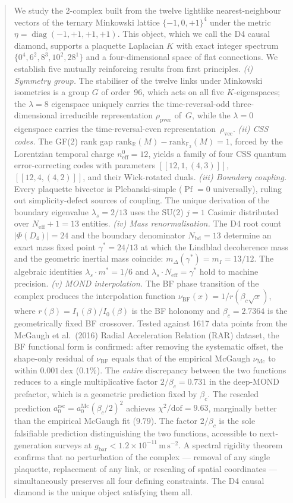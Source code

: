 \documentclass[12pt,a4paper]{article}
\theoremstyle{plain}
\theoremstyle{definition}
\newcommand{\R}{\mathbb{R}}
\newcommand{\GF}[1]{\mathbb{F}_{#1}}
\newcommand{\lams}{\lambda_s}
\newcommand{\gstar}{\gamma^{*}}
\newcommand{\mstar}{m^{*}}
\newcommand{\Neff}{N_{\mathrm{eff}}}
\newcommand{\Nbd}{N_{\mathrm{bd}}}
\newcommand{\betac}{\beta_c}
\newcommand{\nuBF}{\nu_{\mathrm{BF}}}
\newcommand{\nuMc}{\nu_{\mathrm{Mc}}}
\newcommand{\rank}{\mathrm{rank}}
\newcommand{\rhovec}{\rho_{\mathrm{vec}}}
\newcommand{\rhopvec}{\rho_{\mathrm{pvec}}}
\DeclareMathOperator{\Pf}{Pf}
\DeclareMathOperator{\diag}{diag}
\begin{document}
\begin{abstract}
We study the 2-complex built from the twelve lightlike nearest-neighbour vectors
of the ternary Minkowski lattice $\{-1,0,+1\}^4$ under the metric
$\eta = \diag(-1,+1,+1,+1)$.  This object, which we call the D4 causal
diamond, supports a plaquette Laplacian $K$ with exact integer spectrum
$\{0^4, 6^2, 8^3, 10^2, 28^1\}$ and a four-dimensional space of flat
connections.  We establish five mutually reinforcing results from first
principles.
\emph{(i) Symmetry group.}  The stabiliser of the twelve links under
Minkowski isometries is a group $G$ of order~96, which acts on all five
$K$-eigenspaces; the $\lambda=8$ eigenspace uniquely carries the
time-reversal-odd three-dimensional irreducible representation
$\rhopvec$ of~$G$, while the $\lambda=0$ eigenspace carries the
time-reversal-even representation~$\rhovec$.
\emph{(ii) CSS codes.}  The GF(2) rank gap
$\rank_{\R}(M) - \rank_{\GF{2}}(M) = 1$, forced by the Lorentzian temporal
charge $n_{\mathrm{eff}}^0 = 12$, yields a family of four CSS quantum
error-correcting codes with parameters $[[12,1,(4,3)]]$, $[[12,4,(4,2)]]$,
and their Wick-rotated duals.
\emph{(iii) Boundary coupling.}  Every plaquette bivector is Plebanski-simple
($\Pf = 0$ universally), ruling out simplicity-defect sources of coupling.
The unique derivation of the boundary eigenvalue
$\lams = 2/13$ uses the SU(2) $j=1$ Casimir distributed over
$\Neff + 1 = 13$ entities.
\emph{(iv) Mass renormalisation.}  The D4 root count $|\Phi(D_4)| = 24$
and the boundary denominator $\Nbd = 13$ determine an exact mass fixed
point $\gstar = 24/13$ at which the Lindblad decoherence mass and the
geometric inertial mass coincide: $m_\Delta(\gstar) = m_I = 13/12$.
The algebraic identities $\lams \cdot \mstar = 1/6$ and
$\lams \cdot \Neff = \gstar$ hold to machine precision.
\emph{(v) MOND interpolation.}  The BF phase transition of the complex
produces the interpolation function
$\nuBF(x) = 1/r(\betac\sqrt{x})$, where $r(\beta) = I_1(\beta)/I_0(\beta)$
is the BF holonomy and $\betac = 2.7364$ is the geometrically fixed
BF crossover.  Tested against 1617 data points from the
McGaugh et al.\ (2016) Radial Acceleration Relation (RAR) dataset,
the BF functional form is confirmed: after removing the systematic
offset, the shape-only residual of $\nuBF$ equals that of the empirical
McGaugh $\nuMc$ to within $0.001\,\mathrm{dex}$ ($0.1\%$).
The \emph{entire} discrepancy between the two functions reduces to
a single multiplicative factor $2/\betac = 0.731$ in the deep-MOND
prefactor, which is a geometric prediction fixed by $\betac$.
The rescaled prediction $a_0^{\mathrm{rsc}} = a_0^{\mathrm{Mc}}(\betac/2)^2$
achieves $\chi^2/\mathrm{dof} = 9.63$, marginally better than the
empirical McGaugh fit ($9.79$).  The factor $2/\betac$ is the sole
falsifiable prediction distinguishing the two functions, accessible
to next-generation surveys at $g_{\mathrm{bar}} < 1.2\times10^{-11}\,\mathrm{m\,s^{-2}}$.
A spectral rigidity theorem confirms that no perturbation of the
complex — removal of any single plaquette, replacement of any link,
or rescaling of spatial coordinates — simultaneously preserves all
four defining constraints.  The D4 causal diamond is the unique
object satisfying them all.
\end{abstract}
\end{document}
